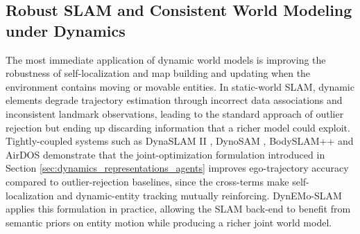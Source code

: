 \subsection{Robust SLAM and Consistent World Modeling under Dynamics}\label{sec:applications_slam_dynamics}
The most immediate application of dynamic world models is improving the robustness of self-localization and map building and updating when the environment contains moving or movable entities. 
In static-world SLAM, dynamic elements degrade trajectory estimation through incorrect data associations and inconsistent landmark observations, leading to the standard approach of outlier rejection but ending up discarding information that a richer model could exploit.
Tightly-coupled systems such as DynaSLAM II \cite{bescos_dynaslam_2021}, DynoSAM \cite{morris_dynosam_2025}, BodySLAM++\cite{henning_bodyslam_2023} and AirDOS \cite{qiu2022airdos} demonstrate that the joint-optimization formulation introduced in Section \ref{sec:dynamics_representations_agents} improves ego-trajectory accuracy compared to outlier-rejection baselines, since the cross-terms make self-localization and dynamic-entity tracking mutually reinforcing.
DynEMo-SLAM \cite{giberna_dynemo-slam_2025} applies this formulation in practice, allowing the SLAM back-end to benefit from semantic priors on entity motion while producing a richer joint world model.

